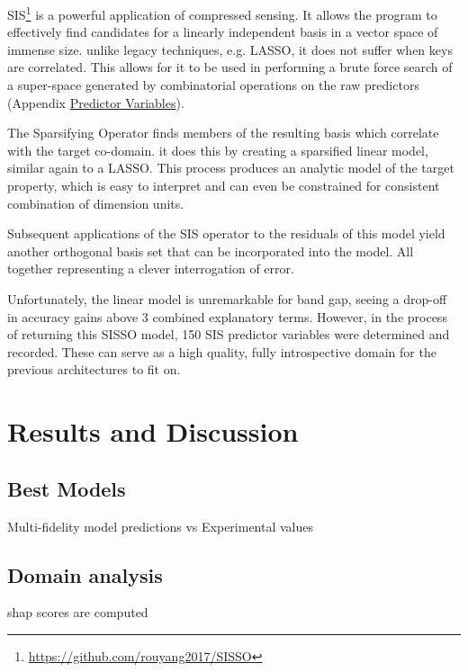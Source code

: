 \documentclass[aip, jmp, amsmath, amssymb]{revtex4-2}
\begin{document}
SIS\footnote{\url{https://github.com/rouyang2017/SISSO}} is a powerful application of compressed
sensing\cite{ghiringhelli-2017-learn-physic}. It allows the program to
effectively find candidates for a linearly independent basis in a
vector space of immense size. unlike legacy techniques, e.g. LASSO, it
does not suffer when keys are
correlated\cite{tibshirani-1996-regres-shrin,gauraha-2018-introd-to-lasso}. This
allows for it to be used in performing a brute force search of a
super-space generated by combinatorial operations on the raw
predictors (Appendix \hyperref[sec:orga229708]{Predictor Variables}).

The Sparsifying Operator finds members of the resulting basis which
correlate with the target co-domain. it does this by creating a
sparsified linear model, similar again to a LASSO. This process
produces an analytic model of the target property, which is easy to
interpret and can even be constrained for consistent combination of
dimension units.

Subsequent applications of the SIS operator to the residuals of this
model yield another orthogonal basis set that can be incorporated into
the model. All together representing a clever interrogation of
error\cite{mayo-1998-error-growt}.

Unfortunately, the linear model is unremarkable for band gap, seeing a
drop-off in accuracy gains above 3 combined explanatory
terms. However, in the process of returning this SISSO model, 150 SIS
predictor variables were determined and recorded. These can serve as a
high quality, fully introspective domain for the previous
architectures to fit on.

\section*{Results and Discussion}
\label{sec:orga74bb37}
\subsection*{Best Models}
\label{sec:org273b926}
 
\begin{multicol}
\centering

\caption{\label{fig:pairplots} Multi-fidelity model predictions vs Experimental values}
\end{multicol}

\subsection*{Domain analysis}
\label{sec:orgb065634}
\Acrfull{shap}
scores\cite{lundberg-2017-unified-approac} are computed
\end{document}
